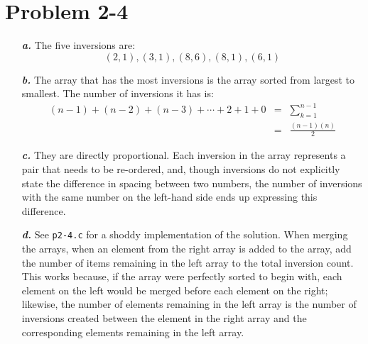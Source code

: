 \documentclass{article}
\begin{document}
\section*{Problem 2-4}

\noindent\begin{enumerate}
	\item[\textbf{\textit{a.}}]
		The five inversions are:
		\begin{equation*}
			(2,1), (3,1), (8,6), (8,1), (6,1)
		\end{equation*}

	\item[\textbf{\textit{b.}}]
		The array that has the most inversions is the array sorted from largest to smallest. The number of inversions it has is:
		\begin{eqnarray*}
			(n-1) + (n-2) + (n-3) + \cdots + 2 + 1 + 0 & = & \sum_{k=1}^{n-1} \\
			& = & \frac{(n-1)(n)}{2}
		\end{eqnarray*}

	\item[\textbf{\textit{c.}}]
		They are directly proportional. Each inversion in the array represents a pair that needs to be re-ordered, and, though inversions do not explicitly state the difference in spacing between two numbers, the number of inversions with the same number on the left-hand side ends up expressing this difference.

	\item[\textbf{\textit{d.}}] 
		See \texttt{p2-4.c} for a shoddy implementation of the solution. When merging the arrays, when an element from the right array is added to the array, add the number of items remaining in the left array to the total inversion count. This works because, if the array were perfectly sorted to begin with, each element on the left would be merged before each element on the right; likewise, the number of elements remaining in the left array is the number of inversions created between the element in the right array and the corresponding elements remaining in the left array.
\end{enumerate}
\end{document}

